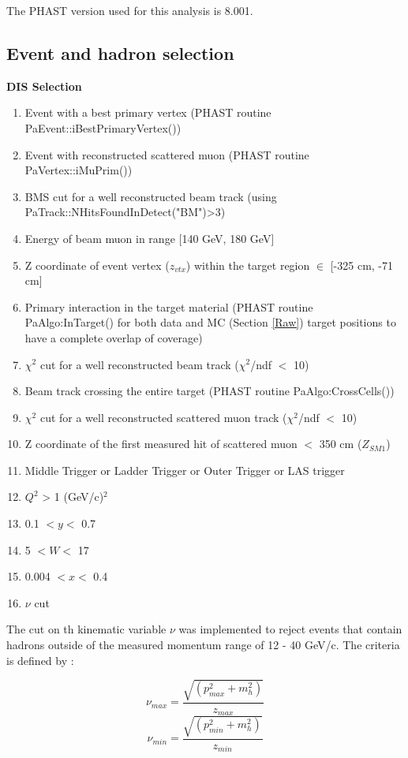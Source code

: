\documentclass[letterpaper,12pt]{article}
\begin{document}
The PHAST version used for this analysis is 8.001.

\subsection{Event and hadron selection}

\hfill
\newline

\textbf{DIS Selection}
\begin{enumerate}
	\item Event with a best primary vertex (PHAST routine PaEvent::iBestPrimaryVertex())
	\item Event with reconstructed scattered muon (PHAST routine PaVertex::iMuPrim())
	\item BMS cut for a well reconstructed beam track (using PaTrack::NHitsFoundInDetect("BM")>3)
	\item Energy of beam muon in range [140 GeV, 180 GeV]
	\item Z coordinate of event vertex ($z_{vtx}$) within the target region $\in$ [-325 cm, -71 cm]
	\item Primary interaction in the target material (PHAST routine PaAlgo:InTarget() for both data and MC (Section \ref{Raw}) target positions
				to have a complete overlap of coverage)
	\item $\chi^2$ cut for a well reconstructed beam track ($\chi^2$/ndf $<$ 10)
	\item Beam track crossing the entire target (PHAST routine PaAlgo:CrossCells())
	\item $\chi^2$ cut for a well reconstructed scattered muon track ($\chi^2$/ndf $<$ 10)
	\item Z coordinate of the first measured hit of scattered muon $<$ 350 cm ($Z_{SM1}$)
	\item Middle Trigger or Ladder Trigger or Outer Trigger or LAS trigger
	\item $Q^2$ > 1 (GeV/c)$^2$
	\item 0.1 $< y <$ 0.7
	\item 5 $< W <$ 17
	\item 0.004 $< x <$ 0.4
	\item $\nu$ cut
\end{enumerate}

The cut on th kinematic variable $\nu$ was implemented to reject events that contain hadrons outside of the measured
momentum range of 12 - 40 GeV/c. The criteria is defined by :

\begin{equation}
  \nu_{max} = \frac{\sqrt{(p^2_{max}+m^2_h)}}{z_{max}}
\end{equation}
\begin{equation}
  \nu_{min} = \frac{\sqrt{(p^2_{min}+m^2_h)}}{z_{min}}
\end{equation}
\end{document}
